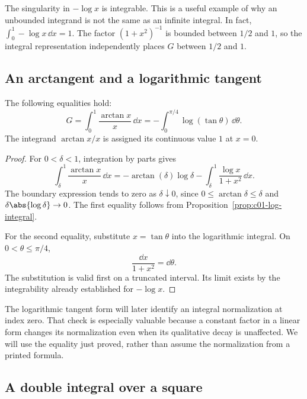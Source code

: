 The singularity in $-\log x$ is integrable. This is a useful example of why an unbounded integrand is not the same as an infinite integral. In fact, $\int_0^1-\log x\,\dd x=1$. The factor $(1+x^2)^{-1}$ is bounded between $1/2$ and $1$, so the integral representation independently places $G$ between $1/2$ and $1$.

\subsection{An arctangent and a logarithmic tangent}

\begin{proposition}
\label{prop:c01-tangent}
The following equalities hold:
\begin{equation}
G=\int_0^1\frac{\arctan x}{x}\,\dd x
=-\int_0^{\pi/4}\log(\tan\theta)\,\dd\theta.
\label{eq:c01-tangent-forms}
\end{equation}
The integrand $\arctan x/x$ is assigned its continuous value $1$ at $x=0$.
\end{proposition}

\begin{proof}
For $0<\delta<1$, integration by parts gives
\[
\int_\delta^1\frac{\arctan x}{x}\,\dd x
=-\arctan(\delta)\log\delta
-\int_\delta^1\frac{\log x}{1+x^2}\,\dd x.
\]
The boundary expression tends to zero as $\delta\downarrow0$, since $0\leq\arctan\delta\leq\delta$ and $\delta\abs{\log\delta}\to0$. The first equality follows from Proposition~\ref{prop:c01-log-integral}.

For the second equality, substitute $x=\tan\theta$ into the logarithmic integral. On $0<\theta\leq\pi/4$,
\[
\frac{\dd x}{1+x^2}=\dd\theta.
\]
The substitution is valid first on a truncated interval. Its limit exists by the integrability already established for $-\log x$.
\end{proof}

The logarithmic tangent form will later identify an integral normalization at index zero. That check is especially valuable because a constant factor in a linear form changes its normalization even when its qualitative decay is unaffected. We will use the equality just proved, rather than assume the normalization from a printed formula.

\subsection{A double integral over a square}

